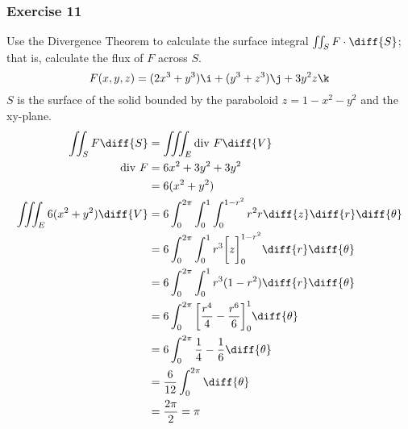 \documentclass{math}
\begin{document}
\subsubsection*{Exercise 11}
Use the Divergence Theorem to calculate the surface integral
\( \iint_{S}F\cdot\diff{S} \); that is, calculate the flux of \( F \) across
\( S \).
\[ F(x,y,z) = (2x^3+y^3)\i+(y^3+z^3)\j+3y^2z\k \]
\( S \) is the surface of the solid bounded by the paraboloid
\( z = 1-x^2-y^2 \) and the xy-plane.
\begin{align*}
  \iint_{S}F\diff{S} &= \iiint_{E}\text{div}~F\diff{V} \\
  \text{div}~F &= 6x^2+3y^2+3y^2 \\
  &= 6(x^2+y^2) \\
  \iiint_{E}6(x^2+y^2)\diff{V} &= 6\int_{0}^{2\pi}\int_{0}^{1}\int_{0}^{1-r^2}
    r^2r\diff{z}\diff{r}\diff{\theta} \\
  &= 6\int_{0}^{2\pi}\int_{0}^{1}r^3\bigg[z\bigg]_{0}^{1-r^2}
    \diff{r}\diff{\theta} \\
  &= 6\int_{0}^{2\pi}\int_{0}^{1}r^3(1-r^2)\diff{r}\diff{\theta} \\
  &= 6\int_{0}^{2\pi}\bigg[\frac{r^4}{4}-\frac{r^6}{6}\bigg]_{0}^{1}
    \diff{\theta} \\
  &= 6\int_{0}^{2\pi}\frac{1}{4}-\frac{1}{6}\diff{\theta} \\
  &= \frac{6}{12}\int_{0}^{2\pi}\diff{\theta} \\
  &= \frac{2\pi}{2} = \pi \\
\end{align*}
\end{document}
